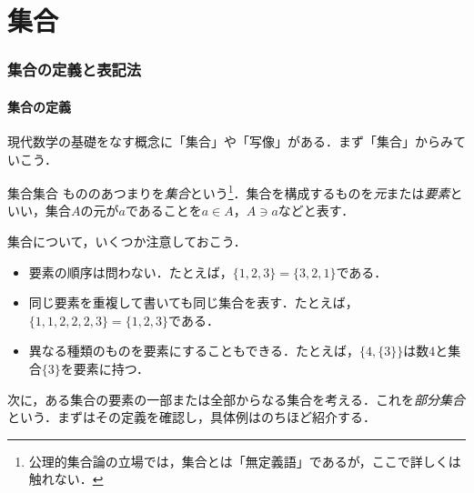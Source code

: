 \part{集合}

\begin{abstract}
この章では，現代数学の基礎をなす「集合」を導入する．まず集合と元を定義し，集合の相等・部分集合・真部分集合といった基本概念を確認する．次に，$\mathbb{N}$，$\mathbb{Z}$，$\mathbb{Q}$，$\mathbb{R}$，$\mathbb{C}$ などのよく使う集合の記号と，外延的記法・内包的記法という集合の表記法を整理する．最後に，共通部分・和集合・差集合・補集合といった集合の演算を定義し，交換法則や分配律などの基本性質を証明しよう．
\end{abstract}

\section{集合の定義と表記法}

\subsection{集合の定義}

現代数学の基礎をなす概念に「集合」や「写像」がある．まず「集合」からみていこう．
\begin{definition}{集合}{集合}
  もののあつまりを\emph{集合}という\footnote{公理的集合論の立場では，集合とは「無定義語」であるが，ここで詳しくは触れない．}．集合を構成するものを\emph{元}または\emph{要素}といい，集合$A$の元が$a$であることを$a \in A$，$A \ni a$などと表す．
\end{definition}

\begin{remark}[集合の表記に関する注意]
  集合について，いくつか注意しておこう．
  \begin{itemize}
    \item 要素の順序は問わない．たとえば，$\{1,2,3\}=\{3,2,1\}$である．
    \item 同じ要素を重複して書いても同じ集合を表す．たとえば，$\{1,1,2,2,2,3\}=\{1,2,3\}$である．
    \item 異なる種類のものを要素にすることもできる．たとえば，$\{4,\{3\}\}$は数$4$と集合$\{3\}$を要素に持つ．
  \end{itemize}
\end{remark}

次に，ある集合の要素の一部または全部からなる集合を考える．これを\emph{部分集合}という．まずはその定義を確認し，具体例はのちほど紹介する．

